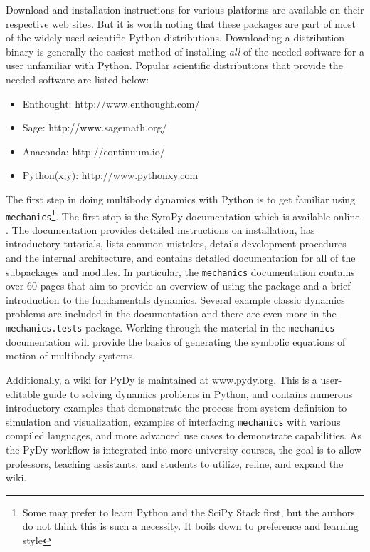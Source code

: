 \documentclass[twocolumn,10pt]{asme2e}
\begin{document}
Download and installation instructions for various platforms are available on
their respective web sites. But it is worth noting that these packages are part
of most of the widely used scientific Python distributions. Downloading a
distribution binary is generally the easiest method of installing \emph{all} of
the needed software for a user unfamiliar with Python. Popular scientific
distributions that provide the needed software are listed below:
%
\begin{itemize}
  \item Enthought: http://www.enthought.com/
  \item Sage: http://www.sagemath.org/
  \item Anaconda: http://continuum.io/
  \item Python(x,y): http://www.pythonxy.com
\end{itemize}

The first step in doing multibody dynamics with Python is to get familiar using
\verb|mechanics|\footnote{Some may prefer to learn Python and the SciPy Stack
first, but the authors do not think this is such a necessity. It boils down to
preference and learning style}. The first stop is the SymPy documentation which
is available online \cite{SymPyDocs}. The documentation provides detailed
instructions on installation, has introductory tutorials, lists common
mistakes, details development procedures and the internal architecture, and
contains detailed documentation for all of the subpackages and modules. In
particular, the \verb|mechanics| documentation contains over 60 pages that aim
to provide an overview of using the package and a brief introduction to the
fundamentals dynamics. Several example classic dynamics problems are included
in the documentation and there are even more in the \verb|mechanics.tests|
package. Working through the material in the \verb|mechanics| documentation
will provide the basics of generating the symbolic equations of motion of
multibody systems.

Additionally, a wiki for PyDy is maintained at www.pydy.org. This is a
user-editable guide to solving dynamics problems in Python, and contains
numerous introductory examples that demonstrate the process from system
definition to simulation and visualization, examples of interfacing
\verb|mechanics| with various compiled languages, and more advanced use cases
to demonstrate capabilities. As the PyDy workflow is integrated into more
university courses, the goal is to allow professors, teaching assistants, and
students to utilize, refine, and expand the wiki.
\end{document}
